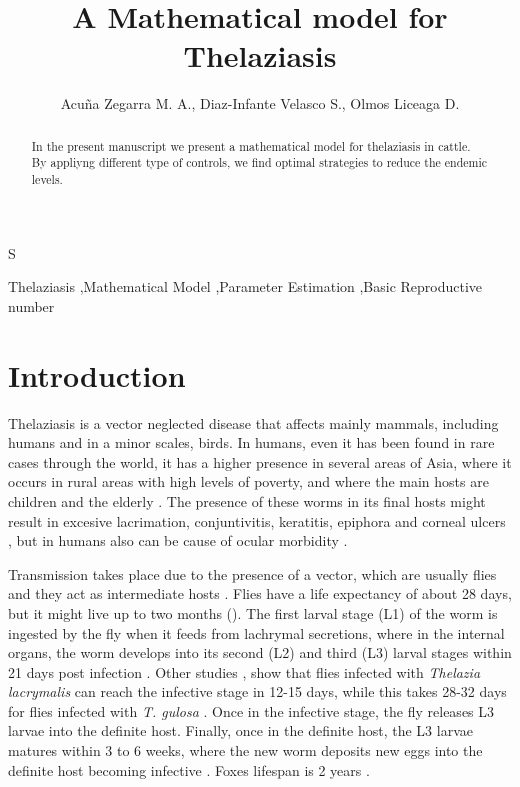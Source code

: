 S\documentclass[preprint,12pt]{elsarticle}
\begin{document}
\begin{frontmatter}

\title{A Mathematical model for Thelaziasis}

\author{Acu\~na Zegarra M. A., Diaz-Infante Velasco S., Olmos Liceaga D.}
\address{Universidad de Sonora}
\begin{abstract}
In the present manuscript we present a mathematical model for thelaziasis in cattle. 
By appliyng different type of controls, we find optimal strategies to reduce the endemic levels.
\end{abstract}

\begin{keyword}
Thelaziasis \sep Mathematical Model \sep Parameter Estimation \sep Basic Reproductive number


\end{keyword}

\end{frontmatter}

\linenumbers

\section{Introduction}
\label{Section:Intro}

\noindent Thelaziasis is a vector neglected disease that affects mainly mammals, including humans and in a minor scales, birds. In humans, even it has been found in rare cases through the world, it has a higher presence in several areas of Asia, where it occurs in rural areas with high levels of poverty, and where the main hosts are children and the elderly \cite{Wang:2014,Zhang:2017,Krishnachary:2014}. The presence of these worms in its final hosts might result in excesive lacrimation, conjuntivitis, keratitis, epiphora and corneal ulcers \cite{Asrat:2016}, but in humans also can be cause of ocular morbidity \cite{Krishnachary:2014}.

\noindent Transmission takes place due to the presence of a vector, which are usually flies and they act as intermediate hosts \cite{Otranto:2003_2}. Flies have a life expectancy of about 28 days, but it might live up to two months (\cite{sanchez:1998}). The first larval stage (L1) of the worm is ingested by the fly when it feeds from lachrymal secretions, where in the internal organs, the worm develops into its second (L2) and third (L3) larval stages within 21 days post infection \cite{Otranto:2003}. Other studies \cite{Chanie:2014}, show that flies infected with \textit{Thelazia lacrymalis} can reach the infective stage in 12-15 days, while this takes 28-32 days for flies infected with \textit{T. gulosa} \cite{Chanie:2014}. Once in the infective stage, the fly releases L3 larvae into the definite host. Finally, once in the definite host, the L3 larvae matures within 3 to 6 weeks, where the new worm deposits new eggs into the definite host becoming infective \cite{Chanie:2014}. Foxes lifespan is 2 years \cite{Devenish:2014}.
\end{document}
